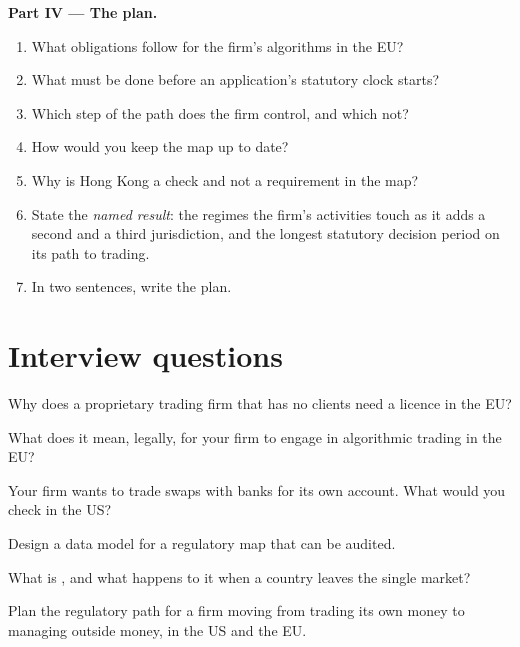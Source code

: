 \begin{problem}
\medskip\noindent\textbf{Part IV --- The plan.}
\begin{enumerate}[resume]
\item What obligations follow for the firm's algorithms in the EU?
\item What must be done before an application's statutory clock starts?
\item Which step of the path does the firm control, and which not?
\item How would you keep the map up to date?
\item Why is Hong Kong a check and not a requirement in the map?
\item State the \emph{named result}: the regimes the firm's activities touch as it adds a second and a third jurisdiction, and the longest
statutory decision period on its path to trading.
\item In two sentences, write the plan.
\end{enumerate}
\end{problem}

\section{Interview questions}

\begin{interviewq}\label{iq:fm:regulators-and-licences:1}
Why does a proprietary trading firm that has no clients need a licence in the EU?
\end{interviewq}

\begin{interviewq}\label{iq:fm:regulators-and-licences:2}
What does it mean, legally, for your firm to engage in algorithmic trading in the EU?
\end{interviewq}

\begin{interviewq}\label{iq:fm:regulators-and-licences:3}
Your firm wants to trade swaps with banks for its own account. What would you check in the US?
\end{interviewq}

\begin{interviewq}\label{iq:fm:regulators-and-licences:4}
Design a data model for a regulatory map that can be audited.
\end{interviewq}

\begin{interviewq}\label{iq:fm:regulators-and-licences:5}
What is , and what happens to it when a country leaves the single market?
\end{interviewq}

\begin{interviewq}\label{iq:fm:regulators-and-licences:6}
Plan the regulatory path for a firm moving from trading its own money to managing outside money, in the US and the EU.
\end{interviewq}
